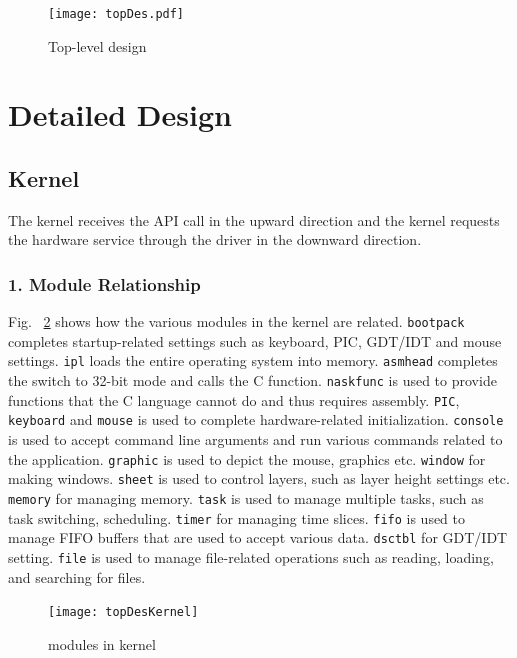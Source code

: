 \documentclass{swfcthesis}
\begin{document}
\begin{figure}[!htbp]
  \centering
  \texttt{[image: topDes.pdf]}
  \caption{Top-level design}
  \label{fig:top-level}
\end{figure}


\section{Detailed Design}
\label{sec:detailed-design}



\subsection{Kernel}
\label{sec:kernel}
The kernel receives the API call in the upward direction and the kernel requests the
hardware service through the driver in the downward direction.

\subsubsection{1. Module Relationship}
\label{sec:overview-1}

Fig. ~\ref{fig:kernel} shows how the various modules in
the kernel are related. \texttt{bootpack} completes startup-related settings such as
keyboard, PIC, GDT/IDT and mouse settings. \texttt{ipl} loads the entire operating system
into memory. \texttt{asmhead} completes the switch to 32-bit mode and calls the C
function. \texttt{naskfunc} is used to provide functions that the C language cannot do and
thus requires assembly. \texttt{PIC}, \texttt{keyboard} and \texttt{mouse} is used to
complete hardware-related initialization. \texttt{console} is used to accept command line
arguments and run various commands related to the application. \texttt{graphic} is used to
depict the mouse, graphics etc. \texttt{window} for making windows. \texttt{sheet} is used to
control layers, such as layer height settings etc. \texttt{memory} for managing
memory. \texttt{task} is used to manage multiple tasks, such as task switching,
scheduling. \texttt{timer} for managing time slices. \texttt{fifo} is used to manage FIFO buffers
that are used to accept various data. \texttt{dsctbl} for GDT/IDT setting. \texttt{file} is used to
manage file-related operations such as reading, loading, and searching for files. 


\begin{figure}[!htbp]
  \centering
  \texttt{[image: topDesKernel]}
  \caption{modules in kernel}
  \label{fig:kernel}
\end{figure}
\end{document}
